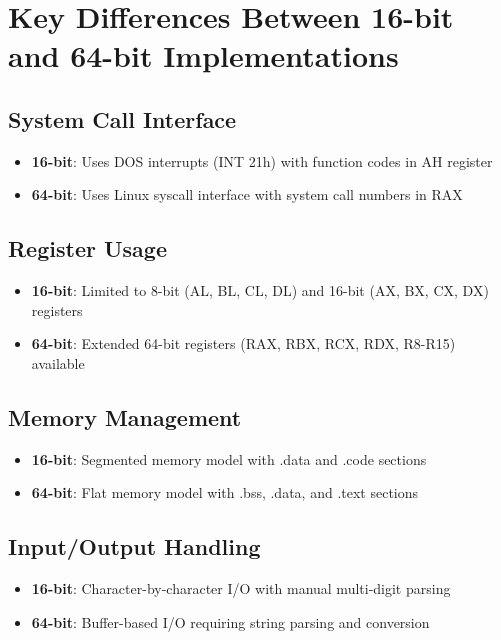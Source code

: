 \documentclass[12pt,a4paper]{article}
\begin{document}
\section{Key Differences Between 16-bit and 64-bit Implementations}

\subsection{System Call Interface}
\begin{itemize}
\item \textbf{16-bit}: Uses DOS interrupts (INT 21h) with function codes in AH register
\item \textbf{64-bit}: Uses Linux syscall interface with system call numbers in RAX
\end{itemize}

\subsection{Register Usage}
\begin{itemize}
\item \textbf{16-bit}: Limited to 8-bit (AL, BL, CL, DL) and 16-bit (AX, BX, CX, DX) registers
\item \textbf{64-bit}: Extended 64-bit registers (RAX, RBX, RCX, RDX, R8-R15) available
\end{itemize}

\subsection{Memory Management}
\begin{itemize}
\item \textbf{16-bit}: Segmented memory model with .data and .code sections
\item \textbf{64-bit}: Flat memory model with .bss, .data, and .text sections
\end{itemize}

\subsection{Input/Output Handling}
\begin{itemize}
\item \textbf{16-bit}: Character-by-character I/O with manual multi-digit parsing
\item \textbf{64-bit}: Buffer-based I/O requiring string parsing and conversion
\end{itemize}
\end{document}
